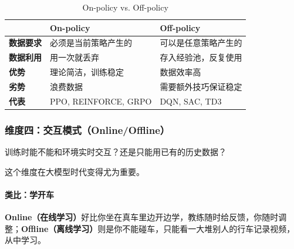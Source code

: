 \begin{table}[htbp]
\centering
\renewcommand{\arraystretch}{1.3}
\small
\begin{tabularx}{\textwidth}{p{2cm}|X|X}
\toprule
& \textbf{On-policy} & \textbf{Off-policy} \\
\midrule
\textbf{数据要求} & 必须是当前策略产生的 & 可以是任意策略产生的 \\
\textbf{数据利用} & 用一次就丢弃 & 存入经验池，反复使用 \\
\textbf{优势} & 理论简洁，训练稳定 & 数据效率高 \\
\textbf{劣势} & 浪费数据 & 需要额外技巧保证稳定 \\
\textbf{代表} & PPO, REINFORCE, GRPO & DQN, SAC, TD3 \\
\bottomrule
\end{tabularx}
\caption{On-policy vs. Off-policy}
\end{table}

\subsubsection{维度四：交互模式（Online/Offline）}

\begin{keyidea}[核心问题]
训练时能不能和环境实时交互？还是只能用已有的历史数据？
\end{keyidea}

这个维度在大模型时代变得尤为重要。

\paragraph{类比：学开车}

\textbf{Online（在线学习）}好比你坐在真车里边开边学，教练随时给反馈，你随时调整；\textbf{Offline（离线学习）}则是你不能碰车，只能看一大堆别人的行车记录视频，从中学习。

